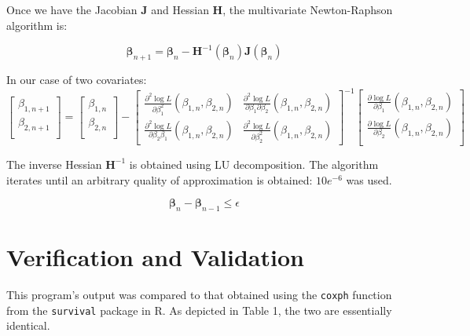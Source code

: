 \documentclass{article}
\begin{document}
Once we have the Jacobian $\bm{J}$ and Hessian $\bm{H}$, the multivariate
Newton-Raphson algorithm is:

\begin{equation}
	\bm{\beta}_{n+1} = \bm{\beta}_n -
	\bm{H}^{-1}(\bm{\beta}_n)\bm{J}(\bm{\beta}_n)
\end{equation}

In our case of two covariates:
\begin{equation}
	\begin{bmatrix}
		\beta_{1, n+1} \\
		\beta_{2, n+1} \\
	\end{bmatrix}
	=
	\begin{bmatrix}
		\beta_{1, n} \\
		\beta_{2, n} \\
	\end{bmatrix}
	-
	\begin{bmatrix}
		\frac{\partial^2 \log L}{\partial \beta_1^2}\left( \beta_{1,
		n}, \beta_{2, n} \right) &

		\frac{\partial^2 \log L}{\partial \beta_1 \partial \beta_2}\left( \beta_{1,
		n}, \beta_{2, n} \right) 
		
		\\

		\frac{\partial^2 \log L}{\partial \beta_2 \beta_1}\left( \beta_{1,
		n}, \beta_{2, n} \right) &

		\frac{\partial^2 \log L}{\partial \beta_2^2}\left( \beta_{1,
		n}, \beta_{2, n} \right) 
	\end{bmatrix}^{-1}
	\begin{bmatrix}
		\frac{\partial \log L}{\partial \beta_1}\left( \beta_{1, n},
		\beta_{2, n}\right) \\
		\frac{\partial \log L}{\partial \beta_2} \left( \beta_{1, n},
		\beta_{2, n} \right)\\
	\end{bmatrix}
\end{equation}

The inverse Hessian $\bm{H}^{-1}$ is obtained using LU decomposition. The algorithm 
iterates until an arbitrary quality of approximation is obtained: $10e^{-6}$ was
used.

\begin{equation}
	\bm{\beta}_{n} - \bm{\beta}_{n-1} \leq \epsilon
\end{equation}

\section*{Verification and Validation}
This program's output was compared to that obtained using
the \texttt{coxph} function from the \texttt{survival} package in R. As depicted
in Table 1, the two are essentially identical.
\end{document}
